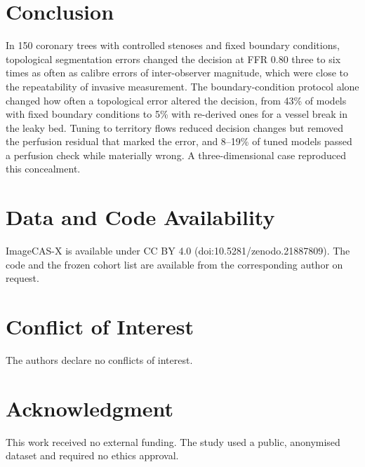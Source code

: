 \documentclass[journal]{IEEEtran}
\begin{document}
\section{Conclusion}
In 150 coronary trees with controlled stenoses and fixed boundary conditions, topological segmentation errors
changed the decision at FFR 0.80 three to six times as often as calibre errors of inter-observer magnitude, which
were close to the repeatability of invasive measurement. The boundary-condition protocol alone changed how often a topological error altered the decision, from 43\% of
models with fixed boundary conditions to 5\% with re-derived ones for a vessel break in the leaky bed. Tuning to
territory flows reduced decision changes but removed the perfusion residual that marked the error, and 8--19\% of
tuned models passed a perfusion check while materially wrong. A three-dimensional case reproduced this concealment.

\section*{Data and Code Availability}
ImageCAS-X is available under CC BY 4.0 (doi:10.5281/zenodo.21887809). The code and the frozen cohort list are
available from the corresponding author on request.

\section*{Conflict of Interest}
The authors declare no conflicts of interest.

\section*{Acknowledgment}
This work received no external funding. The study used a public, anonymised dataset and required no ethics
approval.



\end{document}
